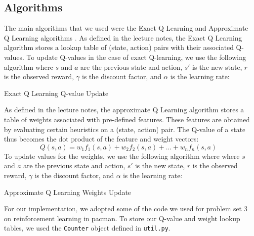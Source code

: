 \documentclass[10pt]{article}
\begin{document}
\subsection{Algorithms}
The main algorithms that we used were the Exact Q Learning and Approximate Q Learning algorithms \cite{CODE:3}. As defined in the lecture notes, the Exact Q Learning algorithm stores a lookup table of (state, action) pairs with their associated Q-values. To update Q-values in the case of exact Q-learning, we use the following algorithm where $s$ and $a$ are the previous state and action, $s'$ is the new state, $r$ is the observed reward, $\gamma$ is the discount factor, and $\alpha$ is the learning rate:
\begin{algorithm}[H]
  \begin{algorithmic}
    \EndProcedure{}
  \end{algorithmic}
  \caption{Exact Q Learning Q-value Update}
\end{algorithm}
As defined in the lecture notes, the approximate Q Learning algorithm stores a table of weights associated with pre-defined features. These features are obtained by evaluating certain heuristics on a (state, action) pair. The Q-value of a state thus becomes the dot product of the feature and weight vectors:
$$Q(s,a) = w_1f_1(s,a) + w_2f_2(s,a) + \ldots + w_nf_n(s,a)$$
To update values for the weights, we use the following algorithm where where $s$ and $a$ are the previous state and action, $s'$ is the new state, $r$ is the observed reward, $\gamma$ is the discount factor, and $\alpha$ is the learning rate:
\begin{algorithm}[H]
  \begin{algorithmic}
        \EndFor{}
    \EndProcedure{}
  \end{algorithmic}
  \caption{Approximate Q Learning Weights Update}
\end{algorithm}
For our implementation, we adopted some of the code we used for problem set 3 on reinforcement learning in pacman. To store our Q-value and weight lookup tables, we used the \texttt{Counter} object defined in \texttt{util.py}.

\bigskip
\end{document}
